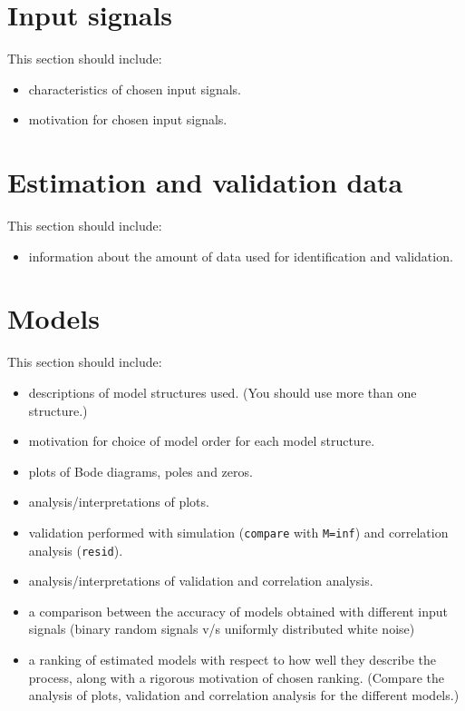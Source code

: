 \documentclass[10pt,a4paper]{article}
\begin{document}
\section{Input signals}
This section should include:
\begin{itemize}
    \item characteristics of chosen input signals.
    \item motivation for chosen input signals.
\end{itemize}

\section{Estimation and validation data}
This section should include:
\begin{itemize}
    \item information about the amount of data used for identification and validation.
\end{itemize}

\section{Models}
This section should include:
\begin{itemize}
    \item descriptions of model structures used. (You should use more than one structure.)
    \item motivation for choice of model order for each model structure.
    \item plots of Bode diagrams, poles and zeros.
    \item analysis/interpretations of plots.
   \item validation performed with simulation (\texttt{compare} with \texttt{M=inf}) and correlation analysis (\texttt{resid}).
   \item analysis/interpretations of validation and correlation analysis.
   \item a comparison between the accuracy of models obtained with different input signals (binary random signals v/s uniformly distributed white noise)
   \item  a ranking of estimated models with respect to how well they describe the process, along with a rigorous motivation of chosen ranking. (Compare the analysis of plots, validation and correlation analysis for the different models.)
\end{itemize}
\end{document}
